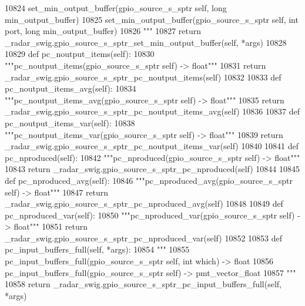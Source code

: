 \begin{DoxyCode}
{{{{{{{{{{{{{{{{{{{{{{{{{{{{{{{{{{10824 \textcolor{stringliteral}{        set\_min\_output\_buffer(gpio\_source\_s\_sptr self, long min\_output\_buffer)}
10825 \textcolor{stringliteral}{        set\_min\_output\_buffer(gpio\_source\_s\_sptr self, int port, long min\_output\_buffer)}
10826 \textcolor{stringliteral}{        """}
10827         \textcolor{keywordflow}{return} \_radar\_swig.gpio\_source\_s\_sptr\_set\_min\_output\_buffer(self, *args)
10828 
10829     \textcolor{keyword}{def }pc_noutput_items(self):
10830         \textcolor{stringliteral}{"""pc\_noutput\_items(gpio\_source\_s\_sptr self) -> float"""}
10831         \textcolor{keywordflow}{return} \_radar\_swig.gpio\_source\_s\_sptr\_pc\_noutput\_items(self)
10832 
10833     \textcolor{keyword}{def }pc_noutput_items_avg(self):
10834         \textcolor{stringliteral}{"""pc\_noutput\_items\_avg(gpio\_source\_s\_sptr self) -> float"""}
10835         \textcolor{keywordflow}{return} \_radar\_swig.gpio\_source\_s\_sptr\_pc\_noutput\_items\_avg(self)
10836 
10837     \textcolor{keyword}{def }pc_noutput_items_var(self):
10838         \textcolor{stringliteral}{"""pc\_noutput\_items\_var(gpio\_source\_s\_sptr self) -> float"""}
10839         \textcolor{keywordflow}{return} \_radar\_swig.gpio\_source\_s\_sptr\_pc\_noutput\_items\_var(self)
10840 
10841     \textcolor{keyword}{def }pc_nproduced(self):
10842         \textcolor{stringliteral}{"""pc\_nproduced(gpio\_source\_s\_sptr self) -> float"""}
10843         \textcolor{keywordflow}{return} \_radar\_swig.gpio\_source\_s\_sptr\_pc\_nproduced(self)
10844 
10845     \textcolor{keyword}{def }pc_nproduced_avg(self):
10846         \textcolor{stringliteral}{"""pc\_nproduced\_avg(gpio\_source\_s\_sptr self) -> float"""}
10847         \textcolor{keywordflow}{return} \_radar\_swig.gpio\_source\_s\_sptr\_pc\_nproduced\_avg(self)
10848 
10849     \textcolor{keyword}{def }pc_nproduced_var(self):
10850         \textcolor{stringliteral}{"""pc\_nproduced\_var(gpio\_source\_s\_sptr self) -> float"""}
10851         \textcolor{keywordflow}{return} \_radar\_swig.gpio\_source\_s\_sptr\_pc\_nproduced\_var(self)
10852 
10853     \textcolor{keyword}{def }pc_input_buffers_full(self, *args):
10854         \textcolor{stringliteral}{"""}
10855 \textcolor{stringliteral}{        pc\_input\_buffers\_full(gpio\_source\_s\_sptr self, int which) -> float}
10856 \textcolor{stringliteral}{        pc\_input\_buffers\_full(gpio\_source\_s\_sptr self) -> pmt\_vector\_float}
10857 \textcolor{stringliteral}{        """}
10858         \textcolor{keywordflow}{return} \_radar\_swig.gpio\_source\_s\_sptr\_pc\_input\_buffers\_full(self, *args)
}}}}}}}}}}}}}}}}}}}}}}}}}}}}}}}}}}
\end{DoxyCode}
